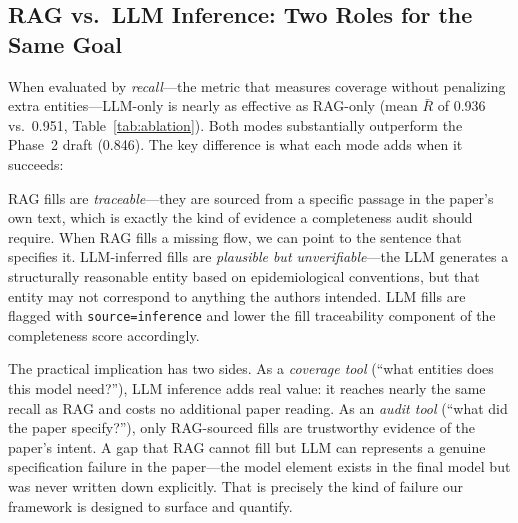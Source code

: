 \subsection{RAG vs.\ LLM Inference: Two Roles for the Same Goal}

When evaluated by \emph{recall}---the metric that measures coverage without penalizing
extra entities---LLM-only is nearly as effective as RAG-only (mean $\bar{R}$ of 0.936
vs.\ 0.951, Table~\ref{tab:ablation}). Both modes substantially outperform the
Phase~2 draft (0.846). The key difference is what each mode adds when it succeeds:

RAG fills are \emph{traceable}---they are sourced from a specific passage in the paper's
own text, which is exactly the kind of evidence a completeness audit should require.
When RAG fills a missing flow, we can point to the sentence that specifies it.
LLM-inferred fills are \emph{plausible but unverifiable}---the LLM generates a
structurally reasonable entity based on epidemiological conventions, but that entity
may not correspond to anything the authors intended. LLM fills are flagged with
\texttt{source=inference} and lower the fill traceability component of the completeness
score accordingly.

The practical implication has two sides. As a \emph{coverage tool} (``what entities
does this model need?''), LLM inference adds real value: it reaches nearly the same
recall as RAG and costs no additional paper reading. As an \emph{audit tool} (``what
did the paper specify?''), only RAG-sourced fills are trustworthy evidence of the paper's
intent. A gap that RAG cannot fill but LLM can represents a genuine specification
failure in the paper---the model element exists in the final model but was never written
down explicitly. That is precisely the kind of failure our framework is designed to
surface and quantify.
